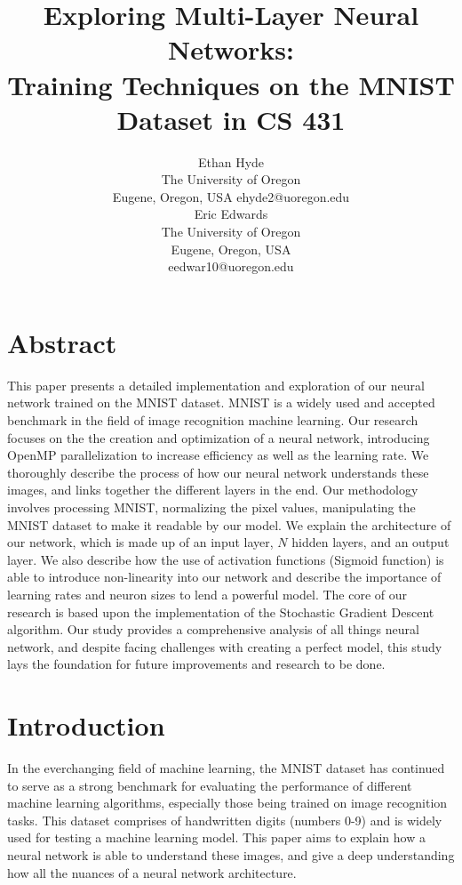 \documentclass[12pt, twocolumn]{report}
\title{\Huge{Exploring Multi-Layer Neural Networks:}\\\Large{Training Techniques on the MNIST Dataset in CS 431}}
\author{%
  \begin{minipage}{0.5\textwidth}
  \centering
  Ethan Hyde\\
  The University of Oregon\\
  Eugene, Oregon, USA
  ehyde2@uoregon.edu
  \end{minipage}%
  \begin{minipage}{0.5\textwidth}
  \centering
  Eric Edwards\\
  The University of Oregon\\
  Eugene, Oregon, USA\\
  eedwar10@uoregon.edu
  \end{minipage}
}
\begin{document}
\maketitle
\newpage%




\section*{Abstract}
This paper presents a detailed implementation and exploration of our neural network trained on the MNIST dataset. MNIST is a widely used and accepted 
benchmark in the field of image recognition machine learning. Our research focuses on the the creation and optimization of a neural network, introducing 
OpenMP parallelization to increase efficiency as well as the learning rate. We thoroughly describe the process of how our neural network understands these images, 
and links together the different layers in the end. Our methodology involves processing MNIST, normalizing the pixel values, manipulating the MNIST dataset to make 
it readable by our model. We explain the architecture of our network, which is made up of an input layer, $N$ hidden layers, and an output layer. We also describe how 
the use of activation functions (Sigmoid function) is able to introduce non-linearity into our network and describe the importance of learning rates and neuron sizes 
to lend a powerful model. The core of our research is based upon the implementation of the Stochastic Gradient Descent algorithm. Our study provides a comprehensive analysis 
of all things neural network, and despite facing challenges with creating a perfect model, this study lays the foundation for future improvements and research to be done.  
\\

\section*{Introduction}
In the everchanging field of machine learning, the MNIST dataset has continued to serve as a strong
benchmark for evaluating the performance of different machine learning algorithms, especially those being
trained on image recognition tasks. This dataset comprises of handwritten digits (numbers 0-9) and is widely
used for testing a machine learning model. This paper aims to explain how a neural network is able to understand these images,
and give a deep understanding how all the nuances of a neural network architecture.
\\
\end{document}
